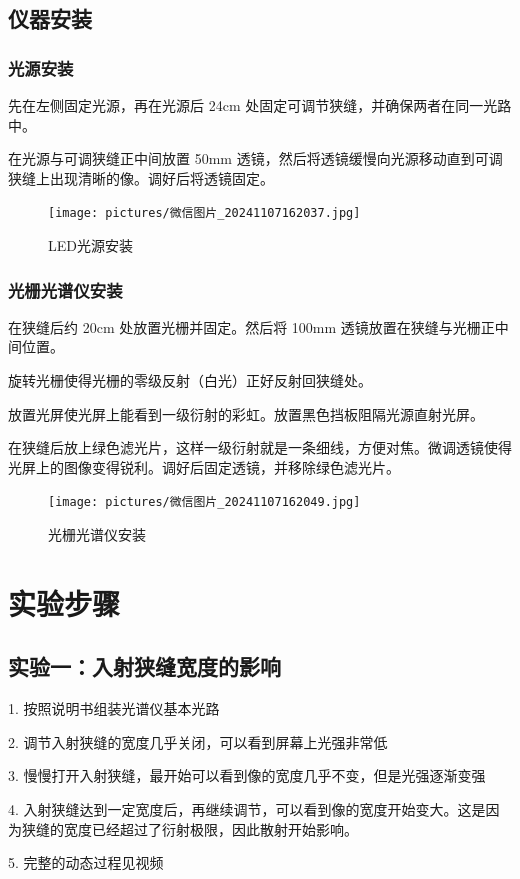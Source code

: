 \documentclass{ctexart}
\begin{document}
\subsection{仪器安装}
\subsubsection{光源安装}
先在左侧固定光源，再在光源后 24cm 处固定可调节狭缝，并确保两者在同一光路中。

在光源与可调狭缝正中间放置 50mm 透镜，然后将透镜缓慢向光源移动直到可调狭缝上出现清晰的像。调好后将透镜固定。
\begin{figure}[htbp]
    \centering
    \texttt{[image: pictures/微信图片\_20241107162037.jpg]}
    \caption{LED光源安装}
\end{figure}
\subsubsection{光栅光谱仪安装}
在狭缝后约 20cm 处放置光栅并固定。然后将 100mm 透镜放置在狭缝与光栅正中间位置。

旋转光栅使得光栅的零级反射（白光）正好反射回狭缝处。

放置光屏使光屏上能看到一级衍射的彩虹。放置黑色挡板阻隔光源直射光屏。

在狭缝后放上绿色滤光片，这样一级衍射就是一条细线，方便对焦。微调透镜使得光屏上的图像变得锐利。调好后固定透镜，并移除绿色滤光片。
\begin{figure}[htbp]
    \centering
    \texttt{[image: pictures/微信图片\_20241107162049.jpg]}
    \caption{光栅光谱仪安装}
\end{figure}
\section{实验步骤}

\subsection{实验一：入射狭缝宽度的影响}
1. 按照说明书组装光谱仪基本光路

2. 调节入射狭缝的宽度几乎关闭，可以看到屏幕上光强非常低

3. 慢慢打开入射狭缝，最开始可以看到像的宽度几乎不变，但是光强逐渐变强

4. 入射狭缝达到一定宽度后，再继续调节，可以看到像的宽度开始变大。这是因为狭缝的宽度已经超过了衍射极限，因此散射开始影响。

5. 完整的动态过程见视频
\end{document}
